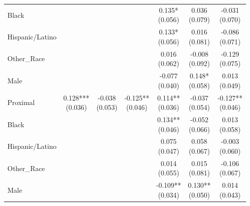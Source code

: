 \begin{table}[!htbp]
\begin{threeparttable}
\begin{tabular}{lcccccc}
Black &  &  &  & \makecell[c]{0.135* \\ (0.056)} & \makecell[c]{0.036 \\ (0.079)} & \makecell[c]{-0.031 \\ (0.070)} \\
Hispanic/Latino &  &  &  & \makecell[c]{0.133* \\ (0.056)} & \makecell[c]{0.016 \\ (0.081)} & \makecell[c]{-0.086 \\ (0.071)} \\
Other\_Race &  &  &  & \makecell[c]{0.016 \\ (0.062)} & \makecell[c]{-0.008 \\ (0.092)} & \makecell[c]{-0.129 \\ (0.075)} \\
Male &  &  &  & \makecell[c]{-0.077 \\ (0.040)} & \makecell[c]{0.148* \\ (0.058)} & \makecell[c]{0.013 \\ (0.049)} \\
\addlinespace
Proximal & \makecell[c]{0.128*** \\ (0.036)} & \makecell[c]{-0.038 \\ (0.053)} & \makecell[c]{-0.125** \\ (0.046)} & \makecell[c]{0.114** \\ (0.036)} & \makecell[c]{-0.037 \\ (0.054)} & \makecell[c]{-0.127** \\ (0.046)} \\
Black &  &  &  & \makecell[c]{0.134** \\ (0.046)} & \makecell[c]{-0.052 \\ (0.066)} & \makecell[c]{0.013 \\ (0.058)} \\
Hispanic/Latino &  &  &  & \makecell[c]{0.075 \\ (0.047)} & \makecell[c]{0.058 \\ (0.067)} & \makecell[c]{-0.003 \\ (0.060)} \\
Other\_Race &  &  &  & \makecell[c]{0.014 \\ (0.055)} & \makecell[c]{0.015 \\ (0.081)} & \makecell[c]{-0.106 \\ (0.067)} \\
Male &  &  &  & \makecell[c]{-0.109** \\ (0.034)} & \makecell[c]{0.130** \\ (0.050)} & \makecell[c]{0.014 \\ (0.043)} \\

\end{tabular}
\end{threeparttable}
\end{table}
